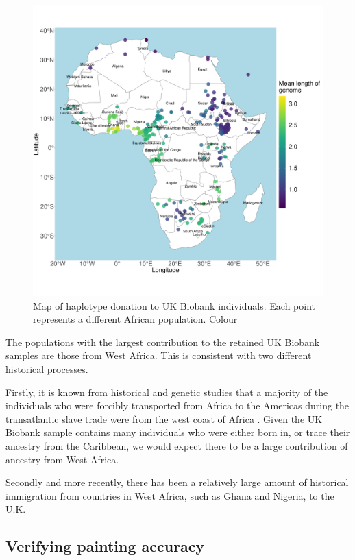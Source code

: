 \begin{figure}[htp]
    \centering
    \includegraphics[width=1.0\textwidth]{../images/chapter3/haplotype_sharing_map_zoomed_II.pdf}
    \caption{Map of haplotype donation to UK Biobank individuals. Each point represents a different African population. Colour }
    \label{fig:haplotype_sharing_map_zoomed_II}
\end{figure}

The populations with the largest contribution to the retained UK Biobank samples are those from West Africa. This is consistent with two different historical processes. 

Firstly, it is known from historical and genetic studies that a majority of the individuals who were forcibly transported from Africa to the Americas during the transatlantic slave trade were from the west coast of Africa \cite{micheletti2020genetic}. Given the UK Biobank sample contains many individuals who were either born in, or trace their ancestry from the Caribbean, we would expect there to be a large contribution of ancestry from West Africa.

Secondly and more recently, there has been a relatively large amount of historical immigration from countries in West Africa, such as Ghana and Nigeria, to the U.K. 

\subsection{Verifying painting accuracy}

